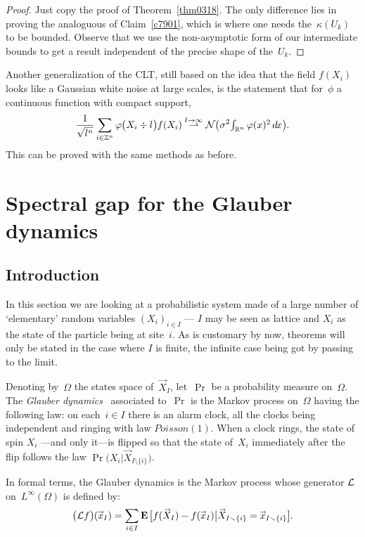 \begin{proof}
Just copy the proof of Theorem~\ref{thm0318}.
The only difference lies in proving the analoguous of Claim~\ref{c7901},
which is where one needs the~$\kappa(U_k)$ to be bounded.
Observe that we use the non-asymptotic form of our intermediate bounds
to get a result independent of the precise shape of the~$U_k$.
\end{proof}

\begin{Rmk}
Another generalization of the CLT, still based on the idea that
the field $f(X_i)$ looks like a Gaussian white noise at large scales,
is the statement that for~$\phi$ a continuous function with compact support,
\[ \frac{1}{\sqrt{\ell^n}} \sum_{i\in\ZZ^n} \phi\big(X_i\div\ell\big) f(X_i)
\stackrel{\ell\longto\infty}{\rightharpoonup}
\mcal{N}\big(\sigma^2 \mathsmaller{\int_{\RR^n} \phi(x)^2\,\dx{x}} \big) .\]
This can be proved with the same methods as before.
\end{Rmk}


\section{Spectral gap for the Glauber dynamics}

\subsection{Introduction}

In this section we are looking at a probabilistic system
made of a large number of `elementary' random variables $(X_i)_{i\in I}$
— $I$ may be seen as lattice and $X_i$ as the state of the particle being at site~$i$.
As is customary by now, theorems will only be stated in the case where $I$ is finite,
the infinite case being got by passing to the limit.

\begin{Def}
Denoting by~$\Omega$ the states space of~$\vec{X}_I$,
let~$\Pr$ be a probability measure on~$\Omega$.
The \emph{Glauber dynamics}~\cite{Glauber, Dobrushin71}
associated to~$\Pr$ is the Markov process on~$\Omega$ having the following law:
on each~$i\in I$ there is an alarm clock,
all the clocks being independent and ringing with law $\mathit{Poisson}(1)$.
When a clock rings, the state of spin $X_i$ —and only it—is flipped
so that the state of~$X_i$ immediately after the flip follows the law
$\Pr\big(X_i|\vec{X}_{I\setminus\{i\}}\big)$.

In formal terms, the Glauber dynamics is the Markov process
whose generator $\mathcal{L}$ on~$L^\infty(\Omega)$ is defined by:
\[ \big(\mcal{L}f\big)(\vec{x}_I)
= \sum_{i\in I} \EE \big[ f(\vec{X}_I) - f(\vec{x}_I) \big|
\vec{X}_{I\setminus\{i\}} = \vec{x}_{I\setminus\{i\}} \big] .\]
\end{Def}

